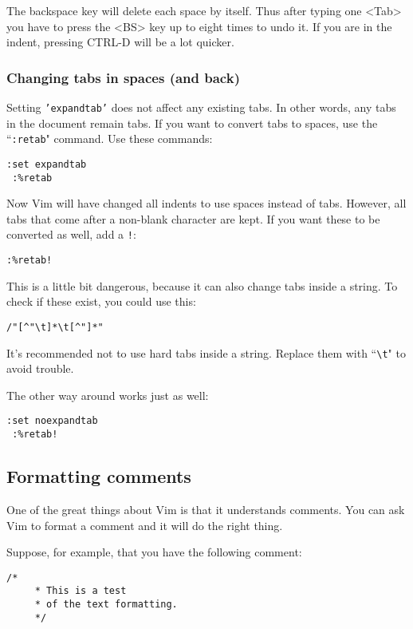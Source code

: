 The backspace key will delete each space by itself.
Thus after typing one <Tab> you have to press the <BS> key up to eight times to undo it.
If you are in the indent, pressing CTRL-D will be a lot quicker.

\subsubsection{Changing tabs in spaces (and back)}
Setting \texttt{'expandtab'} does not affect any existing tabs.
In other words, any tabs in the document remain tabs.
If you want to convert tabs to spaces, use the ``\texttt{:retab}" command.
Use these commands:

\begin{Verbatim}[samepage=true]
 :set expandtab
 :%retab
\end{Verbatim}

Now Vim will have changed all indents to use spaces instead of tabs.
However, all tabs that come after a non-blank character are kept.
If you want these to be converted as well, add a \texttt{!}:

\begin{Verbatim}[samepage=true]
 :%retab!
\end{Verbatim}

This is a little bit dangerous, because it can also change tabs inside a string.
To check if these exist, you could use this:

\begin{Verbatim}[samepage=true]
 /"[^"\t]*\t[^"]*"
\end{Verbatim}

It's recommended not to use hard tabs inside a string.
Replace them with ``\texttt{\textbackslash{}t}" to avoid trouble.

The other way around works just as well:

\begin{Verbatim}[samepage=true]
 :set noexpandtab
 :%retab!
\end{Verbatim}
\subsection{Formatting comments}
One of the great things about Vim is that it understands comments.
You can ask Vim to format a comment and it will do the right thing.

Suppose, for example, that you have the following comment:

\begin{Verbatim}[samepage=true]
    /* 
     * This is a test 
     * of the text formatting. 
     */ 
\end{Verbatim}

